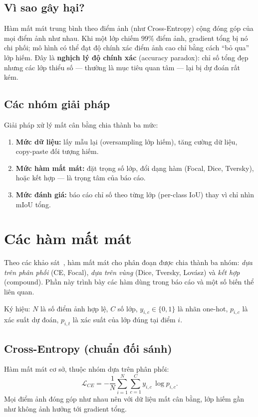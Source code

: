 \subsection{Vì sao gây hại?}
Hàm mất mát trung bình theo điểm ảnh (như Cross-Entropy) cộng đóng góp của mọi điểm
ảnh như nhau. Khi một lớp chiếm $99\%$ điểm ảnh, gradient tổng bị nó chi phối; mô hình
có thể đạt độ chính xác điểm ảnh cao chỉ bằng cách ``bỏ qua'' lớp hiếm. Đây là
\textbf{nghịch lý độ chính xác} (accuracy paradox): chỉ số tổng đẹp nhưng các lớp thiểu
số --- thường là mục tiêu quan tâm --- lại bị dự đoán rất kém.

\subsection{Các nhóm giải pháp}
Giải pháp xử lý mất cân bằng chia thành ba mức:
\begin{enumerate}[leftmargin=1.4cm]
  \item \textbf{Mức dữ liệu:} lấy mẫu lại (oversampling lớp hiếm), tăng cường dữ liệu,
  copy-paste đối tượng hiếm.
  \item \textbf{Mức hàm mất mát:} đặt trọng số lớp, đổi dạng hàm (Focal, Dice,
  Tversky), hoặc kết hợp --- là trọng tâm của báo cáo.
  \item \textbf{Mức đánh giá:} báo cáo chỉ số theo từng lớp (per-class IoU) thay vì chỉ
  nhìn mIoU tổng.
\end{enumerate}

\section{Các hàm mất mát}
\label{sec:loss}

Theo các khảo sát~\cite{jadon2020survey,ma2021loss,losssurvey2023}, hàm mất mát cho
phân đoạn được chia thành ba nhóm: \emph{dựa trên phân phối} (CE, Focal), \emph{dựa
trên vùng} (Dice, Tversky, Lovász) và \emph{kết hợp} (compound). Phần này trình bày các
hàm dùng trong báo cáo và một số biến thể liên quan.

Ký hiệu: $N$ là số điểm ảnh hợp lệ, $C$ số lớp, $y_{i,c}\in\{0,1\}$ là nhãn one-hot,
$p_{i,c}$ là xác suất dự đoán, $p_{i,t}$ là xác suất của lớp đúng tại điểm $i$.

\subsection{Cross-Entropy (chuẩn đối sánh)}
Hàm mất mát cơ sở, thuộc nhóm dựa trên phân phối:
\begin{equation}
\mathcal{L}_{CE} = -\frac{1}{N}\sum_{i=1}^{N}\sum_{c=1}^{C} y_{i,c}\,\log p_{i,c}.
\label{eq:ce}
\end{equation}
Mọi điểm ảnh đóng góp như nhau nên với dữ liệu mất cân bằng, lớp hiếm gần như không ảnh
hưởng tới gradient tổng.

